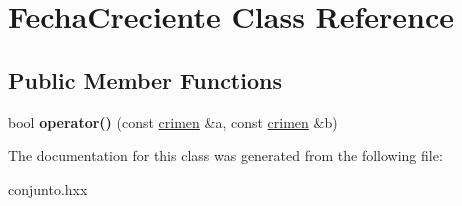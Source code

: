\hypertarget{classFechaCreciente}{}\section{Fecha\+Creciente Class Reference}
\label{classFechaCreciente}
\subsection*{Public Member Functions}
\begin{DoxyCompactItemize}
\item 
\hypertarget{classFechaCreciente_af0342f21242d6564dd967949a58993fc}{}bool {\bfseries operator()} (const \hyperlink{classcrimen}{crimen} \&a, const \hyperlink{classcrimen}{crimen} \&b)\label{classFechaCreciente_af0342f21242d6564dd967949a58993fc}

\end{DoxyCompactItemize}


The documentation for this class was generated from the following file\+:\begin{DoxyCompactItemize}
\item 
conjunto.\+hxx\end{DoxyCompactItemize}
